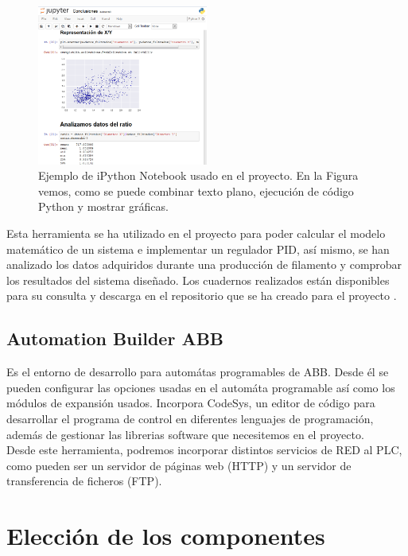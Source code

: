 \begin{figure}[!ht]
    \centering
    \includegraphics[width=0.5\textwidth]{images/ipython.png}
    \caption[Ejemplo de iPython Notebook usado en el proyecto.]{Ejemplo de iPython Notebook usado en el proyecto. En la Figura vemos, como se puede combinar texto plano, ejecución de código Python y mostrar gráficas.}
    \label{fig:ipython}
\end{figure}

Esta herramienta se ha utilizado en el proyecto para poder calcular el modelo matemático de un sistema e implementar un regulador PID, así mismo, se han analizado los datos adquiridos durante una producción de filamento y comprobar los resultados del sistema diseñado. Los cuadernos realizados están disponibles para su consulta y descarga en el repositorio que se ha creado para el proyecto \cite{githubTFG}.

\subsection{Automation Builder ABB}
Es el entorno de desarrollo para automátas programables de ABB. Desde él se pueden configurar las opciones usadas en el automáta programable así como los módulos de expansión usados. Incorpora CodeSys, un editor de código para desarrollar el programa de control en diferentes lenguajes de programación, además de gestionar las librerias software que necesitemos en el proyecto.\\

Desde este herramienta, podremos incorporar distintos servicios de RED al PLC, como pueden ser un servidor de páginas web (HTTP) y un servidor de transferencia de ficheros (FTP).
\section{Elección de los componentes}

